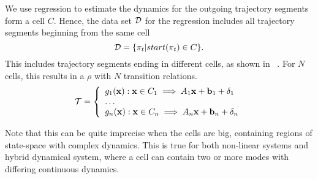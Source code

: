 We use regression to estimate the dynamics for the outgoing trajectory
segments form a cell $C$. Hence, the data set $\mathcal{D}$ for the regression
includes all trajectory segments beginning from the same cell
\[
    \mathcal{D} = \{\pi_t | start(\pi_t) \in C\}.
\]
This includes trajectory segments ending in different cells, as shown
in ~. For $N$ cells, this results in a $\rho$ with $N$ transition relations.
\begin{equation*}
    \mathcal{T} = \left\{
        \begin{array}{ll}
            g_1(\mathbf{x}):\mathbf{x} \in C_1 \implies A_1\mathbf{x} + \mathbf{b}_1 + \delta_1\\
            \ldots \\
            g_n(\mathbf{x}):\mathbf{x} \in C_n \implies A_n\mathbf{x} + \mathbf{b}_n + \delta_n\\
        \end{array}
    \right.
\end{equation*}

Note that this can be quite imprecise when the cells are big,
containing regions of state-space with complex dynamics. This is true
for both non-linear systems and hybrid dynamical system, where a cell
can contain two or more modes with differing continuous dynamics.


